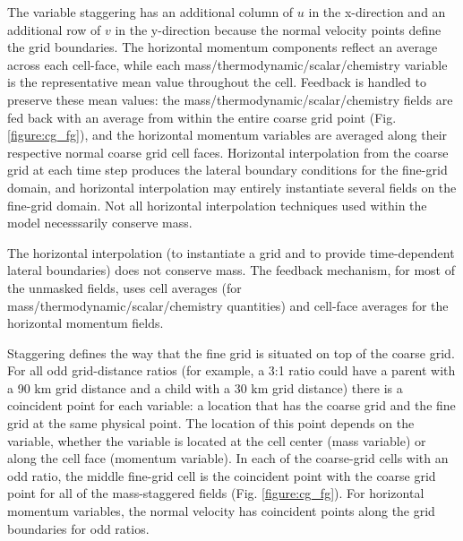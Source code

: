 The variable staggering has an additional column 
of $u$ in the x-direction and an additional row of $v$ in the y-direction
because the normal velocity points define the grid boundaries.
The horizontal momentum components reflect an average across each 
cell-face, while each mass/thermodynamic/scalar/chemistry variable
is the representative mean value throughout the cell.  
Feedback is handled to preserve these mean values: the mass/thermodynamic/scalar/chemistry
fields are fed back with an average from within the entire 
coarse grid point (Fig. \ref{figure:cg_fg}), and the horizontal momentum variables are
averaged along their respective normal coarse grid cell faces.
Horizontal interpolation from the coarse grid at each time step produces the lateral boundary
conditions for the fine-grid domain, and horizontal interpolation may entirely 
instantiate several fields on the fine-grid domain.
Not all horizontal interpolation techniques used within the model necesssarily conserve mass.

The horizontal interpolation (to instantiate a grid and to provide 
time-dependent lateral boundaries) does not conserve mass.  The 
feedback mechanism, for most of the unmasked fields, uses cell 
averages (for mass/thermodynamic/scalar/chemistry quantities) and cell-face 
averages for the horizontal momentum fields.


Staggering defines the way that the fine grid is situated 
on top of the coarse grid.  For all odd grid-distance ratios 
(for example, a 3:1 ratio could have a parent with a 90 km grid distance 
and a child with a 30 km grid distance) 
there is a coincident 
point for each variable: a location that has the coarse grid 
and the fine grid at the same physical point.  The location of 
this point depends on the variable,
whether the variable is located at the cell center (mass variable) or
along the cell face (momentum variable).
In each of the 
coarse-grid cells with an odd ratio, the middle fine-grid cell
is the coincident point with the coarse grid point for all of the 
mass-staggered fields (Fig. \ref{figure:cg_fg}).  
For horizontal momentum variables,
the normal velocity has coincident points along the grid boundaries for odd ratios.

